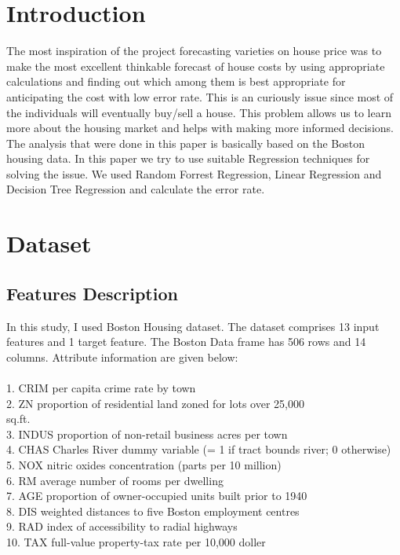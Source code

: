 \documentclass[conference]{IEEEtran}
\begin{document}
\section{Introduction}
The most inspiration of the project forecasting varieties on house price was to make the most excellent thinkable forecast of house costs by using appropriate calculations and finding out which among them is best appropriate for anticipating the cost with low error rate. This is an curiously issue since most of the individuals will eventually buy/sell a house. This problem allows us to learn more about the housing market and helps with making more informed decisions. The analysis that were done in this paper is basically based on the Boston housing data. In this paper we try to use suitable Regression techniques for solving the issue. We used Random Forrest Regression, Linear Regression and Decision Tree Regression and calculate the error rate. 

\section{Dataset}

\subsection{Features Description}

In this study, I used Boston Housing dataset. The dataset comprises 13 input features and 1 target feature. The Boston Data frame has 506 rows and 14 columns.
Attribute information are given below:\\
\\
1. CRIM      per capita crime rate by town\\
2. ZN           proportion of residential land        zoned for lots over 25,000\\ sq.ft.\\
3. INDUS     proportion of non-retail business acres per town\\
4. CHAS      Charles River dummy variable (= 1 if tract bounds  river; 0 otherwise)\\
5. NOX       nitric oxides concentration (parts per 10 million)\\
6. RM        average number of rooms per dwelling\\
7. AGE       proportion of owner-occupied units built prior to 1940\\
8. DIS       weighted distances to five Boston employment centres\\
9. RAD       index of accessibility to radial highways\\
10. TAX      full-value property-tax rate per 10,000 doller\\
 
\end{document}
